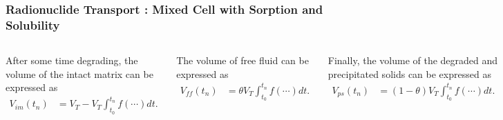 \begin{frame}[ctb!]
  \frametitle{Radionuclide Transport : Mixed Cell with Sorption and Solubility}
  \footnotesize{
  \begin{columns}[c]
After some time degrading, the volume of the intact matrix can be expressed as
\begin{align}
V_{im}(t_n) &= V_T - V_T\int_{t_0}^{t_n} f(\cdots) dt.
\label{vim}
\end{align}

The volume of free fluid can be expressed as
\begin{align}
V_{ff}(t_n) &= \theta V_T \int_{t_0}^{t_n} f(\cdots) dt.
\label{vff}
\end{align}

Finally, the volume of the degraded and precipitated solids can be expressed as
\begin{align}
V_{ps}(t_n) &= (1 - \theta)V_T\int_{t_0}^{t_n} f(\cdots) dt.
\label{vps} 
\end{align}
 

  \begin{figure}[h!]
    \begin{center}
      \includegraphics[width=\textwidth]{images/mixed_cell_degraded.eps}
    \end{center}
  \end{figure}
\end{columns}
}
\end{frame}

